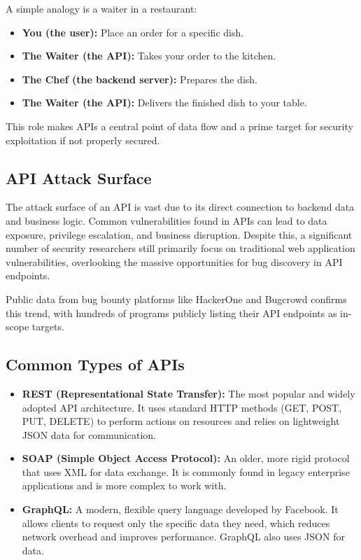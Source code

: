\documentclass[12pt]{article}
\begin{document}
A simple analogy is a waiter in a restaurant:
\begin{itemize}
  \item \textbf{You (the user):} Place an order for a specific dish.
  \item \textbf{The Waiter (the API):} Takes your order to the kitchen.
  \item \textbf{The Chef (the backend server):} Prepares the dish.
  \item \textbf{The Waiter (the API):} Delivers the finished dish to your table.
\end{itemize}

This role makes APIs a central point of data flow and a prime target for security exploitation if
not properly secured.

\subsection*{API Attack Surface}
The attack surface of an API is vast due to its direct connection to backend data and business
logic. Common vulnerabilities found in APIs can lead to data exposure, privilege escalation,
and business disruption. Despite this, a significant number of security researchers still primarily
focus on traditional web application vulnerabilities, overlooking the massive opportunities for
bug discovery in API endpoints.

Public data from bug bounty platforms like HackerOne and Bugcrowd confirms this trend, with
hundreds of programs publicly listing their API endpoints as in-scope targets.

\subsection*{Common Types of APIs}
\begin{itemize}
  \item \textbf{REST (Representational State Transfer):} The most popular and widely adopted API
  architecture. It uses standard HTTP methods (GET, POST, PUT, DELETE) to perform
  actions on resources and relies on lightweight JSON data for communication.
  \item \textbf{SOAP (Simple Object Access Protocol):} An older, more rigid protocol that uses XML
  for data exchange. It is commonly found in legacy enterprise applications and is more
  complex to work with.
  \item \textbf{GraphQL:} A modern, flexible query language developed by Facebook. It allows
  clients to request only the specific data they need, which reduces network overhead and
  improves performance. GraphQL also uses JSON for data.
\end{itemize}
\end{document}
